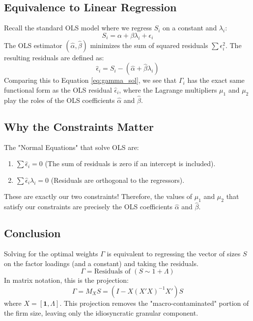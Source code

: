 \documentclass[12pt]{article}
\begin{document}
\subsection{Equivalence to Linear Regression}
Recall the standard OLS model where we regress $S_i$ on a constant and $\lambda_i$:
\begin{equation}
    S_i = \alpha + \beta \lambda_i + \epsilon_i
\end{equation}
The OLS estimator $(\hat{\alpha}, \hat{\beta})$ minimizes the sum of squared residuals $\sum \epsilon_i^2$. The resulting residuals are defined as:
\begin{equation}
    \hat{\epsilon}_i = S_i - (\hat{\alpha} + \hat{\beta} \lambda_i)
\end{equation}
Comparing this to Equation \ref{eq:gamma_sol}, we see that $\Gamma_i$ has the exact same functional form as the OLS residual $\hat{\epsilon}_i$, where the Lagrange multipliers $\mu_1$ and $\mu_2$ play the roles of the OLS coefficients $\hat{\alpha}$ and $\hat{\beta}$.

\subsection{Why the Constraints Matter}
The "Normal Equations" that solve OLS are:
\begin{enumerate}
    \item $\sum \hat{\epsilon}_i = 0$ (The sum of residuals is zero if an intercept is included).
    \item $\sum \hat{\epsilon}_i \lambda_i = 0$ (Residuals are orthogonal to the regressors).
\end{enumerate}
These are exactly our two constraints! Therefore, the values of $\mu_1$ and $\mu_2$ that satisfy our constraints are precisely the OLS coefficients $\hat{\alpha}$ and $\hat{\beta}$.

\subsection{Conclusion}
Solving for the optimal weights $\Gamma$ is equivalent to regressing the vector of sizes $S$ on the factor loadings (and a constant) and taking the residuals.
\begin{equation}
    \Gamma = \text{Residuals of } (S \sim 1 + \Lambda)
\end{equation}
In matrix notation, this is the projection:
\begin{equation}
    \Gamma = M_X S = (I - X(X'X)^{-1}X')S
\end{equation}
where $X = [\mathbf{1}, \Lambda]$. This projection removes the "macro-contaminated" portion of the firm size, leaving only the idiosyncratic granular component.
\end{document}
